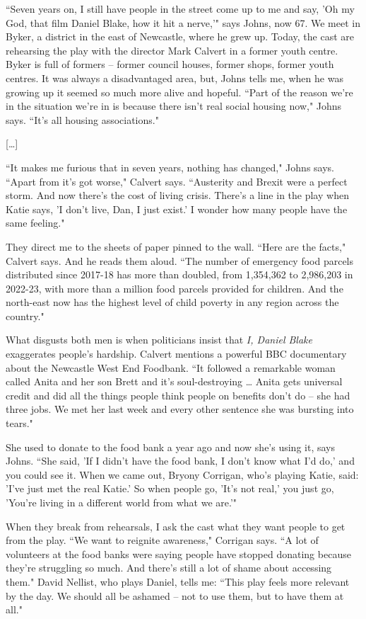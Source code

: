 \documentclass[10pt,a4paper]{article}
\newcommand{\qm}[1]{``#1"}
\begin{document}
\qm{Seven years on, I still have people in the street come up to me and say, 'Oh my God, that film Daniel Blake, how it hit a nerve,'} says Johns, now 67. We meet in Byker, a district in the east of Newcastle, where he grew up. Today, the cast are rehearsing the play with the director Mark Calvert in a former youth centre. Byker is full of formers -- former council houses, former shops, former youth centres. It was always a disadvantaged area, but, Johns tells me, when he was growing up it seemed so much more alive and hopeful. \qm{Part of the reason we're in the situation we're in is because there isn't real social housing now,} Johns says. \qm{It's all housing associations.}

[\ldots]

\qm{It makes me furious that in seven years, nothing has changed,} Johns says. \qm{Apart from it's got worse,} Calvert says. \qm{Austerity and Brexit were a perfect storm. And now there's the cost of living crisis. There's a line in the play when Katie says, 'I don't live, Dan, I just exist.' I wonder how many people have the same feeling.}

They direct me to the sheets of paper pinned to the wall. \qm{Here are the facts,} Calvert says. And he reads them aloud. \qm{The number of emergency food parcels distributed since 2017-18 has more than doubled, from 1,354,362 to 2,986,203 in 2022-23, with more than a million food parcels provided for children. And the north-east now has the highest level of child poverty in any region across the country.}

What disgusts both men is when politicians insist that \textit{I, Daniel Blake} exaggerates people's hardship. Calvert mentions a powerful BBC documentary about the Newcastle West End Foodbank. \qm{It followed a remarkable woman called Anita and her son Brett and it's soul-destroying \ldots{} Anita gets universal credit and did all the things people think people on benefits don't do -- she had three jobs. We met her last week and every other sentence she was bursting into tears.}

She used to donate to the food bank a year ago and now she's using it, says Johns. \qm{She said, 'If I didn't have the food bank, I don't know what I'd do,' and you could see it. When we came out, Bryony Corrigan, who's playing Katie, said: 'I've just met the real Katie.' So when people go, 'It's not real,' you just go, 'You're living in a different world from what we are.'}

When they break from rehearsals, I ask the cast what they want people to get from the play. \qm{We want to reignite awareness,} Corrigan says. \qm{A lot of volunteers at the food banks were saying people have stopped donating because they're struggling so much. And there's still a lot of shame about accessing them.} David Nellist, who plays Daniel, tells me: \qm{This play feels more relevant by the day. We should all be ashamed -- not to use them, but to have them at all.}
\end{document}
